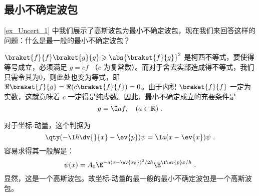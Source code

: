 \subsection{最小不确定波包}
\autoref{ex_Uncert_1} 中我们展示了高斯波包为最小不确定波包，现在我们来回答这样的问题：什么是最一般的最小不确定波包？%


$\braket{f}{f} \braket{g}{g} \geqslant \abs{\braket{f}{g}}^2$ 是柯西不等式，要使得等号成立，必须满足 $g=cf$ （$c$ 为复常数）。而对于舍去实部造成得不等式，我们只需令其为0，则此处也变为等式，即 $\Re\braket{f}{g}=\Re( c\braket{f}{f})=0$。由于内积 $\braket{f}{f}$ 一定为实数，这就意味着 $c$ 一定得是纯虚数。因此，最小不确定成立的充要条件是
\begin{equation}
g=\I af,\quad(a\in \mathbb{R})~.
\end{equation}

对于坐标-动量，这个判据为
\begin{equation}
\qty(-\I\hbar\dv{}{x}-\ev{p})\psi=\I a(x-\ev{x})\psi~.
\end{equation}
容易求得其一般解是：
\begin{equation}
\psi(x)=A_0\E^{-a(x-\ev{x_0})^2/2\hbar}\E^{\I \ev{p}x/\hbar}~.
\end{equation}
显然，这是一个高斯波包。故坐标-动量的最一般的最小不确定波包是一个高斯波包。

